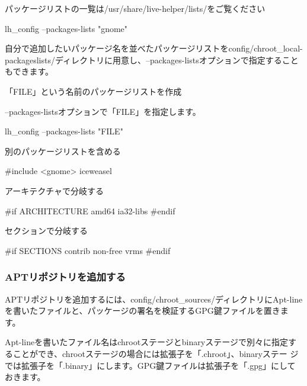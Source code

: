 \documentclass[mingoth,a4paper]{jsarticle}
\begin{document}
パッケージリストの一覧は/usr/share/live-helper/lists/をご覧ください

\begin{commandline}
 lh_config --packages-lists "gnome"
\end{commandline}

自分で追加したいパッケージ名を並べたパッケージリストをconfig/chroot\_local-packageslists/ディレクトリに用意し、--packages-listsオプションで指定することもできます。

「FILE」という名前のパッケージリストを作成

--packages-listsオプションで「FILE」を指定します。
\begin{commandline}
 lh_config --packages-lists "FILE"
\end{commandline}


別のパッケージリストを含める
\begin{commandline}
 #include <gnome>
 iceweasel
\end{commandline}

アーキテクチャで分岐する
\begin{commandline}
 #if ARCHITECTURE amd64
 ia32-libs
 #endif
\end{commandline}

セクションで分岐する
\begin{commandline}
 #if SECTIONS contrib non-free
 vrms
 #endif
\end{commandline}

\subsubsection{APTリポジトリを追加する}
APTリポジトリを追加するには、config/chroot\_sources/ディレクトリにApt-lineを書いたファイルと、パッケージの署名を検証するGPG鍵ファイルを置きます。

Apt-lineを書いたファイル名はchrootステージとbinaryステージで別々に指定す
ることができ、chrootステージの場合には拡張子を「.chroot」、binaryステー
ジでは拡張子を「.binary」にします。GPG鍵ファイルは拡張子を「.gpg」にしておきます。
\end{document}
